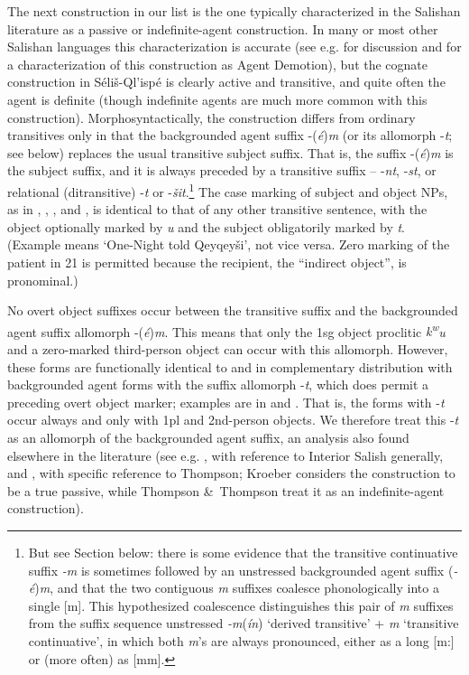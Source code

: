 \documentclass[output=paper,colorlinks,citecolor=brown]{langscibook}
\begin{document}
The next construction in our list is the one typically characterized
in the Salishan literature as a passive or indefinite-agent
construction.  In many or most other Salishan languages this
characterization is accurate (see e.g. \citealt[25--28]{Kroeber:1999} for
discussion and for a characterization of this construction as Agent
Demotion), but the cognate construction in S\'eli\v{s}-Ql'isp\'e is
clearly active and transitive, and quite often the agent is definite
(though indefinite agents are much more common with this
construction).  Morphosyntactically, the construction differs from
ordinary transitives only in that the backgrounded agent suffix -(\emph{\'e})\emph{m} (or its allomorph -\emph{t}; see below) replaces the
usual transitive subject suffix.  That is, the suffix -(\emph{\'e})\emph{m} is the subject suffix, and it is always preceded by a transitive
suffix -- {-\emph{nt}}, -\emph{st}, or relational (ditransitive) -\emph{{\textltilde}t} or -\emph{\v{s}it}.\footnote{But see Section  below:
there is some evidence that the transitive continuative suffix \emph{-m} is sometimes followed by an unstressed backgrounded agent suffix
(\emph{-\'e})\emph{m}, and that the two contiguous \emph{m} suffixes
coalesce phonologically into a single [m].  This hypothesized
coalescence distinguishes this pair of \emph{m} suffixes from the
suffix sequence unstressed \emph{-m}(\emph{\'in}) `derived transitive' +
\emph{m} `transitive continuative', in which both \emph{m}'s are always
pronounced, either as a long [m:] or (more often) as [m{\textschwa}m].
} The case marking of subject and object NPs, as in , , , and
, is identical to that of any other transitive sentence, with the
object optionally marked by \emph{{\textltilde}u} and the subject
obligatorily marked by \emph{t}.  (Example  means `One-Night told
Qeyqey\v{s}i', not vice versa.  Zero marking of the patient in 21 is
permitted because the recipient, the ``indirect object'', is
pronominal.)


No overt object suffixes occur between the transitive suffix and the
background\-ed agent suffix allomorph -(\emph{\'e})\emph{m}.  This means
that only the 1sg object proclitic \emph{{k\textsuperscript w}u} and a
zero-marked third-person object can occur with this allomorph.
However, these forms are functionally identical to and in
complementary distribution with backgrounded agent forms with the
suffix allomorph -\emph{t}, which does permit a preceding overt object
marker; examples are in  and .  That is, the forms with -\emph{t}
occur always and only with 1pl and 2nd-person objects.  We therefore
treat this -\emph{t} as an allomorph of the backgrounded agent suffix,
an analysis also found elsewhere in the literature (see
e.g. \citealt[25--28]{Kroeber:1999}, with reference to Interior
Salish generally, and \citealt[63]{Thompson&Thompson:1992}, with specific
reference to Thompson; Kroeber considers the construction to be a true
passive, while Thompson \&\ Thompson treat it as an indefinite-agent
construction).
\end{document}
